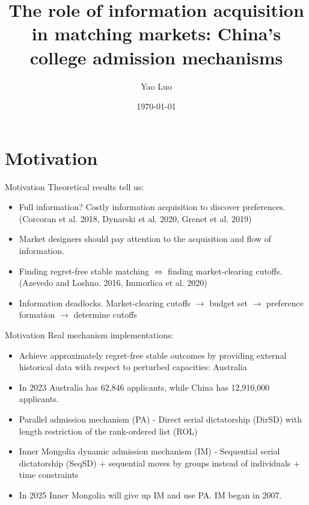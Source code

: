 \documentclass[dvipsnames,mathserif]{beamer}
\begin{document}
\rightskip\rightmargin
\title{The role of information acquisition in matching markets: China's college admission mechanisms}
\author{Yao Luo}


\footnotesize{\date{\today }


\begin{frame}
\maketitle
\end{frame}


%
\section{Motivation}
\begin{frame}{Motivation}
Theoretical results tell us:
\vspace{0.5cm}
    \begin{itemize}
        \item Full information? Costly information acquisition to discover preferences.(Corcoran et al. 2018, Dynarski et al. 2020, Grenet et al. 2019)\\
        \item Market designers should pay attention to the acquisition and flow of information.\\
        \item Finding regret-free stable matching $\Leftrightarrow$ finding market-clearing cutoffs.(Azevedo and Loshno. 2016, Immorlica et al. 2020)\\
        \item Information deadlocks. Market-clearing cutoffs $\rightarrow$ budget set $\rightarrow$ preference formation $\rightarrow$ determine cutoffs
    \end{itemize}
\end{frame}

\begin{frame}{Motivation}
Real mechanism implementations:
\vspace{0.5cm}
    \begin{itemize}
        \item Achieve approximately regret-free stable outcomes by providing external historical data with respect to perturbed capacities: Australia\\
        \item In 2023 Australia has 62,846 applicants, while China has 12,910,000 applicants. \\
        \item Parallel admission mechanism (PA) - Direct serial dictatorship (DirSD) with length restriction of the rank-ordered list (ROL)\\
        \item Inner Mongolia dynamic admission mechanism (IM) - Sequential serial dictatorship (SeqSD) + sequential moves by groups instead of individuals + time constraints\\
        \item In 2025 Inner Mongolia will give up IM and use PA. IM began in 2007. 
    \end{itemize}
\end{frame}

}
\end{document}
